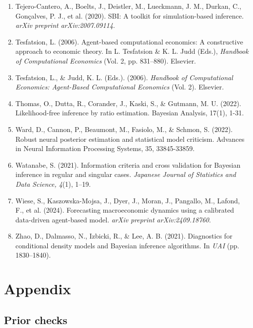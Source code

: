 \documentclass[12pt]{article}
\begin{document}
\begin{enumerate}
\item Tejero-Cantero, A., Boelts, J., Deistler, M., Lueckmann, J. M., Durkan, C., Gonçalves, P. J., et al. (2020). SBI: A toolkit for simulation-based inference. \textit{arXiv preprint arXiv:2007.09114}.

\item Tesfatsion, L. (2006). Agent-based computational economics: A constructive approach to economic theory. In L. Tesfatsion \& K. L. Judd (Eds.), \textit{Handbook of Computational Economics} (Vol. 2, pp. 831--880). Elsevier.

\item Tesfatsion, L., \& Judd, K. L. (Eds.). (2006). \textit{Handbook of Computational Economics: Agent-Based Computational Economics} (Vol. 2). Elsevier.

\item Thomas, O., Dutta, R., Corander, J., Kaski, S., \& Gutmann, M. U. (2022). Likelihood-free inference by ratio estimation. Bayesian Analysis, 17(1), 1-31.

\item Ward, D., Cannon, P., Beaumont, M., Fasiolo, M., \& Schmon, S. (2022). Robust neural posterior estimation and statistical model criticism. Advances in Neural Information Processing Systems, 35, 33845-33859.

\item Watanabe, S. (2021). Information criteria and cross validation for Bayesian inference in regular and singular cases. \textit{Japanese Journal of Statistics and Data Science, 4}(1), 1--19.

\item Wiese, S., Kaszowska-Mojsa, J., Dyer, J., Moran, J., Pangallo, M., Lafond, F., et al. (2024). Forecasting macroeconomic dynamics using a calibrated data-driven agent-based model. \textit{arXiv preprint arXiv:2409.18760}.

\item Zhao, D., Dalmasso, N., Izbicki, R., \& Lee, A. B. (2021). Diagnostics for conditional density models and Bayesian inference algorithms. In \textit{UAI} (pp. 1830--1840).

\end{enumerate} 

\section*{Appendix}

\subsection*{Prior checks}
\end{document}
